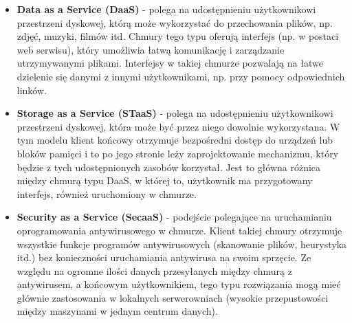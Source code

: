 \documentclass[10pt,a4paper,titlepage,twoside]{report}
\begin{document}
\begin{itemize}
	\item \textbf{Data as a Service (DaaS)} - polega na udostępnieniu użytkownikowi przestrzeni dyskowej, którą może wykorzystać do przechowania plików\cite{ad10}, np. zdjęć, muzyki, filmów itd. Chmury tego typu oferują interfejs (np. w postaci web serwisu), który umożliwia łatwą komunikację i zarządzanie utrzymywanymi plikami. Interfejsy w takiej chmurze pozwalają na łatwe dzielenie się danymi z innymi użytkownikami, np. przy pomocy odpowiednich linków.
	\item \textbf{Storage as a Service (STaaS)} - polega na udostępnieniu użytkownikowi przestrzeni dyskowej, która może być przez niego dowolnie wykorzystana. W tym modelu klient końcowy otrzymuje bezpośredni dostęp do urządzeń lub bloków pamięci i to po jego stronie leży zaprojektowanie mechanizmu, który będzie z tych udostępnionych zasobów korzystał\cite{ad10}. Jest to główna różnica między chmurą typu DaaS, w której to, użytkownik ma przygotowany interfejs, również uruchomiony w chmurze.
	\item \textbf{Security as a Service (SecaaS)} - podejście polegające na uruchamianiu oprogramowania antywirusowego w chmurze. Klient takiej chmury otrzymuje wszystkie funkcje programów antywirusowych (skanowanie plików, heurystyka itd.) bez konieczności uruchamiania antywirusa na swoim sprzęcie. Ze względu na ogromne ilości danych przesyłanych między chmurą z antywirusem, a końcowym użytkownikiem, tego typu rozwiązania mogą mieć głównie zastosowania w lokalnych serwerowniach (wysokie przepustowości między maszynami w jednym centrum danych).
\end{itemize}
\end{document}
